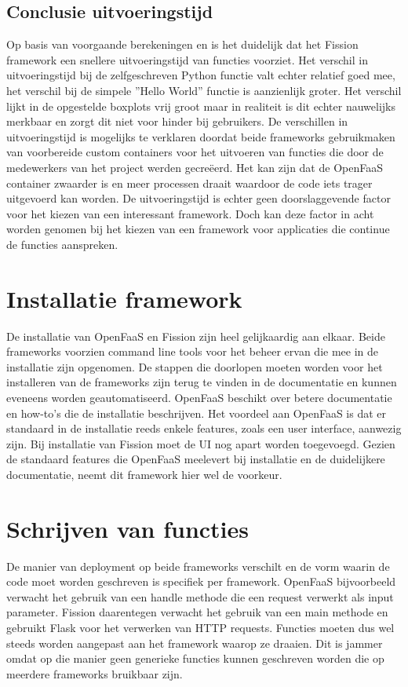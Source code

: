 \subsection{Conclusie uitvoeringstijd}
Op basis van voorgaande berekeningen en is het duidelijk dat het Fission framework een snellere uitvoeringstijd van functies voorziet. Het verschil in uitvoeringstijd bij de zelfgeschreven Python functie valt echter relatief goed mee, het verschil bij de simpele ''Hello World'' functie is aanzienlijk groter. Het verschil lijkt in de opgestelde boxplots vrij groot maar in realiteit is dit echter nauwelijks merkbaar en zorgt dit niet voor hinder bij gebruikers. De verschillen in uitvoeringstijd is mogelijks te verklaren doordat beide frameworks gebruikmaken van voorbereide custom containers voor het uitvoeren van functies die door de medewerkers van het project werden gecreëerd. Het kan zijn dat de OpenFaaS container zwaarder is en meer processen draait waardoor de code iets trager uitgevoerd kan worden. De uitvoeringstijd is echter geen doorslaggevende factor voor het kiezen van een interessant framework. Doch kan deze factor in acht worden genomen bij het kiezen van een framework voor applicaties die continue de functies aanspreken.

\section{Installatie framework}
\label{sec:vergelijking-installatie}
De installatie van OpenFaaS en Fission zijn heel gelijkaardig aan elkaar. Beide frameworks voorzien command line tools voor het beheer ervan die mee in de installatie zijn opgenomen. De stappen die doorlopen moeten worden voor het installeren van de frameworks zijn terug te vinden in de documentatie en kunnen eveneens worden geautomatiseerd. OpenFaaS beschikt over betere documentatie en how-to's die de installatie beschrijven. Het voordeel aan OpenFaaS is dat er standaard in de installatie reeds enkele features, zoals een user interface, aanwezig zijn. Bij installatie van Fission moet de UI nog apart worden toegevoegd. Gezien de standaard features die OpenFaaS meelevert bij installatie en de duidelijkere documentatie, neemt dit framework hier wel de voorkeur.
\section{Schrijven van functies}
De manier van deployment op beide frameworks verschilt en de vorm waarin de code moet worden geschreven is specifiek per framework. OpenFaaS bijvoorbeeld verwacht het gebruik van een handle methode die een request verwerkt als input parameter. Fission daarentegen verwacht het gebruik van een main methode en gebruikt Flask voor het verwerken van HTTP requests. Functies moeten dus wel steeds worden aangepast aan het framework waarop ze draaien. Dit is jammer omdat op die manier geen generieke functies kunnen geschreven worden die op meerdere frameworks bruikbaar zijn. 

